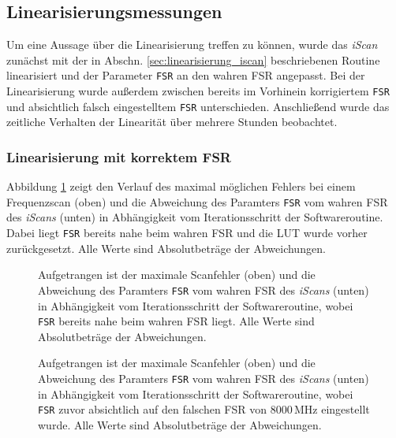 \subsection{Linearisierungsmessungen}\label{sec:linearisierungsmessungen}
Um eine Aussage über die Linearisierung treffen zu können, wurde das
\textit{iScan} zunächst mit der in Abschn. \ref{sec:linearisierung_iscan}
beschriebenen Routine linearisiert und der Parameter \lstinline|FSR| an den wahren FSR
angepasst. Bei der Linearisierung wurde außerdem
zwischen bereits im Vorhinein korrigiertem \lstinline|FSR| und absichtlich
falsch eingestelltem \lstinline|FSR| unterschieden. Anschließend wurde das
zeitliche Verhalten der Linearität über mehrere Stunden beobachtet.

\subsubsection{Linearisierung mit korrektem
FSR}\label{subsubsec:linearisierung_FSR_okay}
Abbildung \ref{fig:linearisierung_FSR_okay} zeigt den Verlauf des maximal
möglichen Fehlers bei einem Frequenzscan (oben) und die Abweichung des Paramters \lstinline|FSR| vom wahren FSR des \textit{iScans} (unten) in Abhängigkeit vom Iterationsschritt der
Softwareroutine. Dabei liegt \lstinline|FSR| bereits nahe beim wahren FSR und
die LUT wurde vorher zurückgesetzt. Alle Werte sind Absolutbeträge der
Abweichungen.
\begin{figure}[h]
 	\centering
 	\footnotesize
	
	\caption[Linearisierung \textit{iScan}, FSR okay]{Aufgetrangen ist der
	maximale Scanfehler (oben) und die Abweichung des Paramters
	\lstinline|FSR| vom wahren FSR des \textit{iScans} (unten) in Abhängigkeit vom
	Iterationsschritt der Softwareroutine, wobei \lstinline|FSR| bereits nahe beim
	wahren FSR liegt. Alle Werte sind Absolutbeträge der Abweichungen.}
	\label{fig:linearisierung_FSR_okay}
\end{figure}
\begin{figure}[h]
 	\centering
 	\footnotesize
	
	\caption[Linearisierung \textit{iScan}, FSR korrigiert (1)]{Aufgetrangen ist
	der maximale Scanfehler (oben) und die Abweichung des Paramters
	\lstinline|FSR| vom wahren FSR des \textit{iScans} (unten) in Abhängigkeit vom
	Iterationsschritt der Softwareroutine, wobei \lstinline|FSR| zuvor
	absichtlich auf den falschen FSR von $8000\,$MHz eingestellt wurde. Alle Werte
	sind Absolutbeträge der Abweichungen.}
	\label{fig:linearisierung_FSR_korr}
\end{figure}

